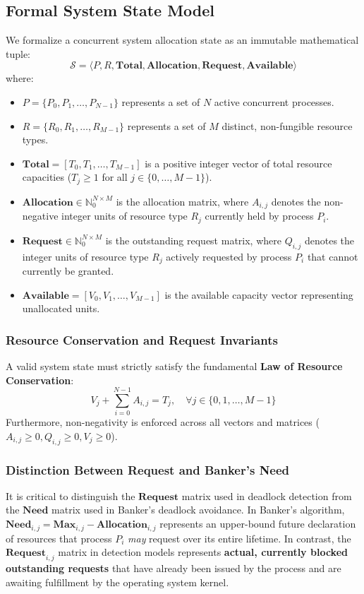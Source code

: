 \documentclass[11pt,a4paper]{article}
\begin{document}
\subsection{Formal System State Model}
We formalize a concurrent system allocation state as an immutable mathematical tuple:
\begin{equation}
    \mathcal{S} = \langle P, R, \mathbf{Total}, \mathbf{Allocation}, \mathbf{Request}, \mathbf{Available} \rangle
\end{equation}
where:
\begin{itemize}
    \item $P = \{P_0, P_1, \dots, P_{N-1}\}$ represents a set of $N$ active concurrent processes.
    \item $R = \{R_0, R_1, \dots, R_{M-1}\}$ represents a set of $M$ distinct, non-fungible resource types.
    \item $\mathbf{Total} = [T_0, T_1, \dots, T_{M-1}]$ is a positive integer vector of total resource capacities ($T_j \ge 1$ for all $j \in \{0, \dots, M-1\}$).
    \item $\mathbf{Allocation} \in \mathbb{N}_0^{N \times M}$ is the allocation matrix, where $A_{i,j}$ denotes the non-negative integer units of resource type $R_j$ currently held by process $P_i$.
    \item $\mathbf{Request} \in \mathbb{N}_0^{N \times M}$ is the outstanding request matrix, where $Q_{i,j}$ denotes the integer units of resource type $R_j$ actively requested by process $P_i$ that cannot currently be granted.
    \item $\mathbf{Available} = [V_0, V_1, \dots, V_{M-1}]$ is the available capacity vector representing unallocated units.
\end{itemize}

\subsubsection{Resource Conservation and Request Invariants}
A valid system state must strictly satisfy the fundamental \textbf{Law of Resource Conservation}:
\begin{equation}
    V_j + \sum_{i=0}^{N-1} A_{i,j} = T_j, \quad \forall j \in \{0, 1, \dots, M-1\}
\end{equation}
Furthermore, non-negativity is enforced across all vectors and matrices ($A_{i,j} \ge 0, Q_{i,j} \ge 0, V_j \ge 0$).

\subsubsection{Distinction Between Request and Banker's Need}
It is critical to distinguish the $\mathbf{Request}$ matrix used in deadlock detection from the $\mathbf{Need}$ matrix used in Banker's deadlock avoidance. In Banker's algorithm, $\mathbf{Need}_{i,j} = \mathbf{Max}_{i,j} - \mathbf{Allocation}_{i,j}$ represents an upper-bound future declaration of resources that process $P_i$ \emph{may} request over its entire lifetime. In contrast, the $\mathbf{Request}_{i,j}$ matrix in detection models represents \textbf{actual, currently blocked outstanding requests} that have already been issued by the process and are awaiting fulfillment by the operating system kernel.
\end{document}
